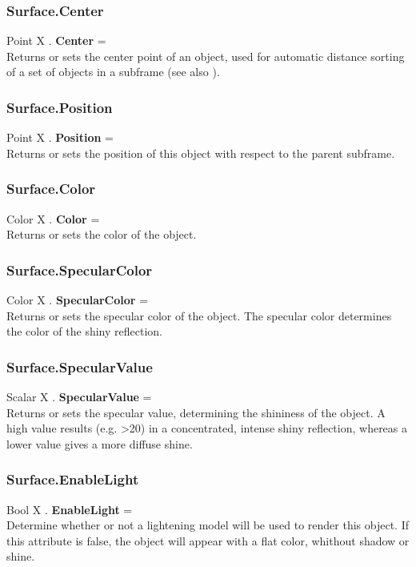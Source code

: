 \subsubsection{Surface.Center \label{F:Surface:Center}}
Point X . \textbf{Center} = \\
Returns or sets the center point of an object, used for automatic distance sorting of a set of objects in a subframe (see also ).

\subsubsection{Surface.Position \label{F:Surface:Position}}
Point X . \textbf{Position} = \\
Returns or sets the position of this object with respect to the parent subframe.

\subsubsection{Surface.Color \label{F:Surface:Color}}
Color X . \textbf{Color} = \\
Returns or sets the color of the object.

\subsubsection{Surface.SpecularColor \label{F:Surface:SpecularColor}}
Color X . \textbf{SpecularColor} = \\
Returns or sets the specular color of the object. The specular color determines the color of the shiny reflection.

\subsubsection{Surface.SpecularValue \label{F:Surface:SpecularValue}}
Scalar X . \textbf{SpecularValue} = \\
Returns or sets the specular value, determining the shininess of the object. A high value results (e.g. >20) in a concentrated, intense shiny reflection, whereas a lower value gives a more diffuse shine.

\subsubsection{Surface.EnableLight \label{F:Surface:EnableLight}}
Bool X . \textbf{EnableLight} = \\
Determine whether or not a lightening model will be used to render this object. If this attribute is false, the object will appear with a flat color, whithout shadow or shine.


